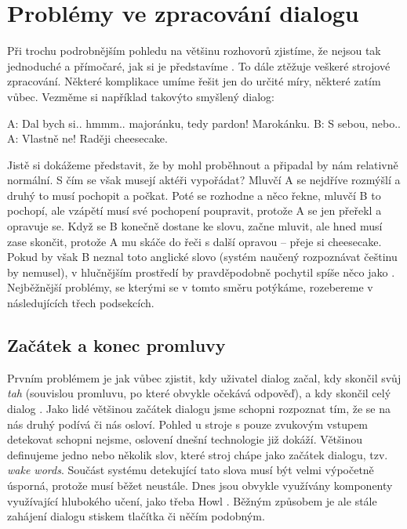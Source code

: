\section{Problémy ve zpracování dialogu}

Při trochu podrobnějším pohledu na většinu rozhovorů zjistíme, že nejsou
tak jednoduché a přímočaré, jak si je představíme \citep[sekce 24.1]{jurafsky_slp_2020}. To dále ztěžuje
veškeré strojové zpracování. Některé komplikace umíme řešit jen do určité
míry, některé zatím vůbec. Vezměme si například takovýto smyšlený dialog:

\begin{code}
    A: Dal bych si.. hmmm.. majoránku, tedy pardon! Marokánku.
    B: S sebou, nebo..
    A: Vlastně ne! Raději cheesecake.
\end{code}

Jistě si dokážeme představit, že by mohl proběhnout a připadal by nám
relativně normální. S čím se však musejí aktéři vypořádat? Mluvčí A se
nejdříve rozmýšlí a druhý to musí pochopit a počkat. Poté se rozhodne
a něco řekne, mluvčí B to pochopí, ale vzápětí musí své pochopení
poupravit, protože A se jen přeřekl a opravuje se. Když se B konečně
dostane ke slovu, začne mluvit, ale hned musí zase skončit, protože
A mu skáče do řeči s další opravou -- přeje si cheesecake. Pokud by
však B neznal toto anglické slovo (systém naučený rozpoznávat češtinu
by nemusel), v hlučnějším prostředí by pravděpodobně pochytil spíše
něco jako . Nejběžnější problémy, se kterými se v tomto
směru potýkáme, rozebereme v následujících třech podsekcích.

\subsection{Začátek a konec promluvy}

Prvním problémem je jak vůbec zjistit, kdy uživatel dialog začal, kdy
skončil svůj \textit{tah} (souvislou promluvu, po které obvykle očekává odpověď),
a kdy skončil celý dialog \citep[strana 494]{jurafsky_slp_2020}.
Jako lidé většinou začátek dialogu jsme schopni rozpoznat tím, že se na
nás druhý podívá či nás osloví. Pohled u stroje s pouze zvukovým vstupem
detekovat schopni nejsme, oslovení dnešní technologie již dokáží. Většinou
definujeme jedno nebo několik slov, které stroj chápe jako začátek dialogu,
tzv. \textit{wake words}. Součást systému detekující tato slova musí být velmi
výpočetně úsporná, protože musí běžet neustále. Dnes jsou obvykle
využívány komponenty využívající hlubokého učení, jako třeba Howl
\citep{tang_howl_2020}.
Běžným způsobem je ale stále zahájení dialogu stiskem tlačítka či něčím
podobným.

